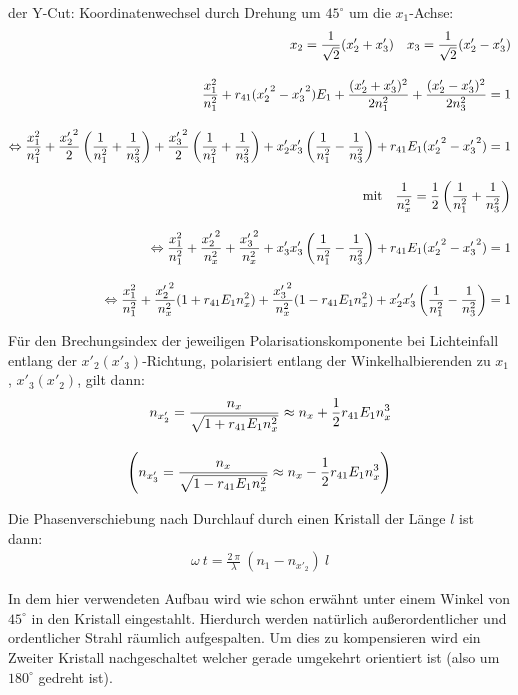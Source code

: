 \documentclass[12pt]{article}
\begin{document}
der Y-Cut: Koordinatenwechsel durch Drehung um $45^\circ$ um die $x_1$-Achse:
\begin{align*}
 \notag x_2 = \frac{1}{\sqrt{2}} (x'_2 + x'_3) \quad x_3 = \frac{1}{\sqrt{2}} (x'_2 - x'_3) \\[10pt] 
 \frac{x_1^2}{n_1^2} + r_{41} ( {x'_2}^2 - {x'_3}^2) E_1 + \frac{(x'_2 + x'_3)^2}{2 n_1^2} + \frac{(x'_2 - x'_3)^2}{2 n_3^2} = 1\\[10pt]
\notag \Leftrightarrow \frac{x_1^2}{n_1^2} + \frac{{x'_2}^2}{2} \left(\frac{1}{n_1^2} + \frac{1}{n_3^2}\right) + \frac{{x'_3}^2}{2} \left(\frac{1}{n_1^2} + \frac{1}{n_3^2}\right) + x'_2 x'_3 \left(\frac{1}{n_1^2} - \frac{1}{n_3^2}\right) + r_{41} E_1 ({x'_2}^2 - {x'_3}^2) = 1 \\[10pt]
\notag \textnormal{mit} \quad \frac{1}{n_x^2} = \frac{1}{2}\left(\frac{1}{n_1^2} + \frac{1}{n_3^2}\right) \\[10pt]
\notag \Leftrightarrow \frac{x_1^2}{n_1^2} + \frac{{x'_2}^2}{n_x^2} + \frac{{x'_3}^2}{n_x^2} + x'_3 x'_3 \left(\frac{1}{n_1^2} - \frac{1}{n_3^2} \right) + r_{41} E_1 ({x'_2}^2 - {x'_3}^2) = 1 \\[10pt]
\notag \Leftrightarrow \frac{x_1^2}{n_1^2} + \frac{{x'_2}^2}{n_x^2} (1 + r_{41} E_1 n_x^2) + \frac{{x'_3}^2}{n_x^2} (1 - r_{41} E_1 n_x^2) + x'_2 x'_3 \left(\frac{1}{n_1^2} - \frac{1}{n_3^2}\right) = 1
\end{align*}

Für den Brechungsindex der jeweiligen Polarisationskomponente bei Lichteinfall entlang der $x'_2 (x'_3)$-Richtung, polarisiert entlang der Winkelhalbierenden zu $x_1$, $x'_3 (x'_2)$, gilt dann:
\begin{align}
 n_{x'_2} = \frac{n_x}{\sqrt{1 + r_{41} E_1 n_x^2}} \approx n_x + \frac{1}{2} r_{41} E_1 n_x^3 \\[10pt]
\notag \left( n_{x'_3} = \frac{n_x}{\sqrt{1 - r_{41} E_1 n_x^2}} \approx n_x - \frac{1}{2} r_{41} E_1 n_x^3 \right)
\end{align}

Die Phasenverschiebung nach Durchlauf durch einen Kristall der Länge $l$ ist dann:
\begin{align}
 \omega~t = \frac{2~\pi}{\lambda}~(n_1 - n_{x'_2})~l
\end{align}

In dem hier verwendeten Aufbau wird wie schon erwähnt unter einem Winkel von $45^\circ$ in den Kristall eingestahlt. Hierdurch werden natürlich außerordentlicher und ordentlicher Strahl räumlich aufgespalten. Um dies zu kompensieren wird ein Zweiter Kristall nachgeschaltet welcher gerade umgekehrt orientiert ist (also um $180^\circ$ gedreht ist).
\end{document}
